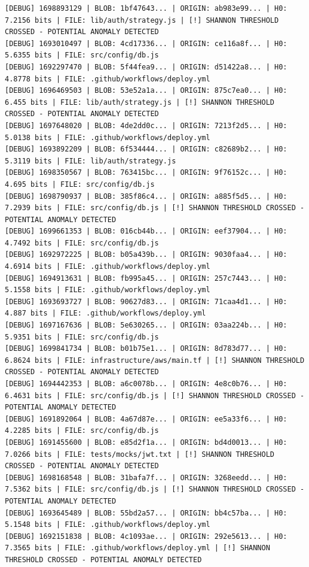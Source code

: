 \documentclass[12pt, a4paper, oneside]{report}
\begin{document}
\begin{lstlisting}[basicstyle=\tiny\ttfamily]
[DEBUG] 1698893129 | BLOB: 1bf47643... | ORIGIN: ab983e99... | H0: 7.2156 bits | FILE: lib/auth/strategy.js | [!] SHANNON THRESHOLD CROSSED - POTENTIAL ANOMALY DETECTED
[DEBUG] 1693010497 | BLOB: 4cd17336... | ORIGIN: ce116a8f... | H0: 5.6355 bits | FILE: src/config/db.js
[DEBUG] 1692297470 | BLOB: 5f44fea9... | ORIGIN: d51422a8... | H0: 4.8778 bits | FILE: .github/workflows/deploy.yml
[DEBUG] 1696469503 | BLOB: 53e52a1a... | ORIGIN: 875c7ea0... | H0: 6.455 bits | FILE: lib/auth/strategy.js | [!] SHANNON THRESHOLD CROSSED - POTENTIAL ANOMALY DETECTED
[DEBUG] 1697648020 | BLOB: 4de2dd0c... | ORIGIN: 7213f2d5... | H0: 5.0138 bits | FILE: .github/workflows/deploy.yml
[DEBUG] 1693892209 | BLOB: 6f534444... | ORIGIN: c82689b2... | H0: 5.3119 bits | FILE: lib/auth/strategy.js
[DEBUG] 1698350567 | BLOB: 763415bc... | ORIGIN: 9f76152c... | H0: 4.695 bits | FILE: src/config/db.js
[DEBUG] 1698790937 | BLOB: 385f86c4... | ORIGIN: a885f5d5... | H0: 7.2939 bits | FILE: src/config/db.js | [!] SHANNON THRESHOLD CROSSED - POTENTIAL ANOMALY DETECTED
[DEBUG] 1699661353 | BLOB: 016cb44b... | ORIGIN: eef37904... | H0: 4.7492 bits | FILE: src/config/db.js
[DEBUG] 1692972225 | BLOB: b05a439b... | ORIGIN: 9030faa4... | H0: 4.6914 bits | FILE: .github/workflows/deploy.yml
[DEBUG] 1694913631 | BLOB: fb995a45... | ORIGIN: 257c7443... | H0: 5.1558 bits | FILE: .github/workflows/deploy.yml
[DEBUG] 1693693727 | BLOB: 90627d83... | ORIGIN: 71caa4d1... | H0: 4.887 bits | FILE: .github/workflows/deploy.yml
[DEBUG] 1697167636 | BLOB: 5e630265... | ORIGIN: 03aa224b... | H0: 5.9351 bits | FILE: src/config/db.js
[DEBUG] 1699841734 | BLOB: b01b75e1... | ORIGIN: 8d783d77... | H0: 6.8624 bits | FILE: infrastructure/aws/main.tf | [!] SHANNON THRESHOLD CROSSED - POTENTIAL ANOMALY DETECTED
[DEBUG] 1694442353 | BLOB: a6c0078b... | ORIGIN: 4e8c0b76... | H0: 6.4631 bits | FILE: src/config/db.js | [!] SHANNON THRESHOLD CROSSED - POTENTIAL ANOMALY DETECTED
[DEBUG] 1691892064 | BLOB: 4a67d87e... | ORIGIN: ee5a33f6... | H0: 4.2285 bits | FILE: src/config/db.js
[DEBUG] 1691455600 | BLOB: e85d2f1a... | ORIGIN: bd4d0013... | H0: 7.0266 bits | FILE: tests/mocks/jwt.txt | [!] SHANNON THRESHOLD CROSSED - POTENTIAL ANOMALY DETECTED
[DEBUG] 1698168548 | BLOB: 31bafa7f... | ORIGIN: 3268eedd... | H0: 7.5362 bits | FILE: src/config/db.js | [!] SHANNON THRESHOLD CROSSED - POTENTIAL ANOMALY DETECTED
[DEBUG] 1693645489 | BLOB: 55bd2a57... | ORIGIN: bb4c57ba... | H0: 5.1548 bits | FILE: .github/workflows/deploy.yml
[DEBUG] 1692151838 | BLOB: 4c1093ae... | ORIGIN: 292e5613... | H0: 7.3565 bits | FILE: .github/workflows/deploy.yml | [!] SHANNON THRESHOLD CROSSED - POTENTIAL ANOMALY DETECTED

\end{lstlisting}
\end{document}
